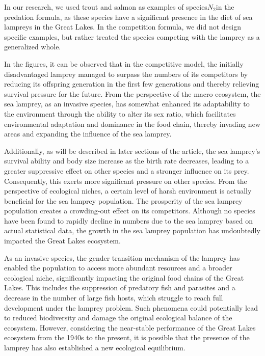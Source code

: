\documentclass[12pt]{article}
\begin{document}
In our research, we used trout and salmon as examples of species$N_2$in the predation
formula, as these species have a significant presence in the diet of sea lampreys in the Great Lakes.
In the competition formula, we did not design specific examples, but rather treated the species
competing with the lamprey as a generalized whole.

In the figures, it can be observed that in the competitive model, the initially disadvantaged
lamprey managed to surpass the numbers of its competitors by reducing its offspring generation
in the first few generations and thereby relieving survival pressure for the future. From the
perspective of the macro ecosystem, the sea lamprey, as an invasive species, has somewhat
enhanced its adaptability to the environment through the ability to alter its sex ratio,
which facilitates environmental adaptation and dominance in the food chain, thereby invading
new areas and expanding the influence of the sea lamprey.

Additionally, as will be described in later sections of the article, the sea lamprey's survival
ability and body size increase as the birth rate decreases, leading to a greater suppressive
effect on other species and a stronger influence on its prey. Consequently, this exerts more
significant pressure on other species. From the perspective of ecological niches, a certain
level of harsh environment is actually beneficial for the sea lamprey population. The prosperity
of the sea lamprey population creates a crowding-out effect on its competitors.
Although no species have been found to rapidly decline in numbers due to the sea
lamprey based on actual statistical data, the growth in the sea lamprey population has undoubtedly
impacted the Great Lakes ecosystem.

As an invasive species, the gender transition mechanism of the lamprey has enabled the population
to access more abundant resources and a broader ecological niche, significantly impacting the
original food chains of the Great Lakes. This includes the suppression of predatory fish and
parasites and a decrease in the number of large fish hosts, which struggle to reach full
development under the lamprey problem. Such phenomena could potentially lead to reduced
biodiversity and damage the original ecological balance of the ecosystem. However, considering
the near-stable performance of the Great Lakes ecosystem from the 1940s to the present, it is
possible that the presence of the lamprey has also established a new ecological equilibrium.
\end{document}
